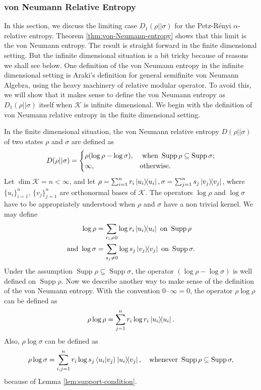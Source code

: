 \documentclass[12pt,a4paper,oneside]{article}
\numberwithin{equation}{section}
\theoremstyle{definition}  %
\theoremstyle{plain}  %
\theoremstyle{remark} %
\newcommand{\CK}{\mathcal{K}}
\let\tr\relax
\DeclareMathOperator{\tr}{Tr}
\DeclareMathOperator{\supp}{Supp}
\begin{document}
\subsubsection{von Neumann Relative Entropy} \label{sec:vN-entropy} In this section, we discuss the limiting case $D_1(\rho||\sigma)$  for the Petz-R\'enyi $\alpha$-relative entropy. Theorem \ref{thm:von-Neumann-entropy} shows that this limit is the von Neumann entropy.  The result is straight forward in the finite dimensional setting. But the infinite dimensional situation is a bit tricky because of reasons we shall see below. One definition of the von Neumann entropy in the infinite dimensional setting is  Araki's definition \cite{araki1976relative, araki1977relative} for general semifinite von Neumann Algebra, using the heavy machinery of relative modular operator. To avoid this, we will show that it makes sense to define the von Neumann entropy as $D_1(\rho||\sigma)$ itself when $\CK $ is infinite dimensional. We begin with the definition of von Neumann relative entropy in the finite dimensional setting.
 
 
 In the finite dimensional situation, the von Neumann relative entropy $D(\rho||\sigma)$ of two states $\rho$ and $\sigma$ are defined as \begin{align*}
     D(\rho||\sigma) = \begin{cases}
       \tr\rho(\log\rho-\log\sigma), &\textnormal{ when } \supp \rho \subseteq \supp \sigma;\\
       \infty, & \textnormal{otherwise.}
     \end{cases}
 \end{align*}
Let $\dim \CK  = n<\infty$, and let $\rho = \sum_{i=1}^{n}r_i \ketbra{u_i}, \sigma = \sum_{j=1}^{n}s_j \ketbra{v_j} $, where $\{u_i\}_{i=1}^{n}$, $\{v_j\}_{j=1}^{n}$ are orthonormal bases of $\CK $. The operators  $\log\rho$ and $\log \sigma$ have to be appropriately understood when $\rho$ and $\sigma$ have a  non trivial kernel. We may define
\begin{align}\begin{split}\label{eq:log-finite-dim}
    \log \rho &=  \sum_{r_i\neq0}\log r_i \ketbra{u_i} \textnormal{ on } \supp \rho\\
    \textnormal{and }\log \sigma &=  \sum_{s_j\neq0}\log s_j \ketbra{v_j} \textnormal{ on } \supp \sigma.
    \end{split}
\end{align} 
 Under the assumption $\supp \rho \subseteq \supp \sigma$, the operator $(\log \rho -\log \sigma)$ is well defined on $\supp \rho$. Now we describe another way to make sense of the definition of the von Neumann entropy. With the convention $0\cdot\infty=0$, the operator $\rho\log\rho$ can be defined as  \[\rho\log\rho =\sum_{j=1}^{n}r_i\log r_i \ketbra{u_i}. \]
Also, $\rho\log\sigma$ can be defined as \begin{align}\label{eq:rholog-sigma-finite-dim}
    \rho\log \sigma = \sum_{i,j=1}^n r_i\log s_j\braket{u_i}{v_j}\ketbra{u_i}{v_j},\quad\textnormal{whenever } \supp \rho \subseteq \supp \sigma,
\end{align}
because of Lemma \ref{lem:support-condition}.
\end{document}
